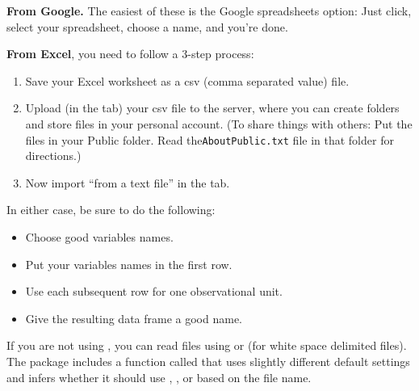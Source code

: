 
\textbf{From Google.}
The easiest of these is the Google spreadsheets option: Just click, select
your spreadsheet, choose a name, and you're done.

\textbf{From Excel},
you need to follow a 3-step process:
\begin{enumerate}
\item
Save your Excel worksheet as a csv (comma separated value) file.
\item
Upload (in the  tab) your csv file to the server, where you can create folders and store
files in your personal account.  
(To share things with others: Put the files in your Public folder.  
Read the\texttt{AboutPublic.txt} file in that folder for directions.)
\item
Now import ``from a text file'' in the  tab.
\end{enumerate}

In either case, be sure to do the following:
\begin{itemize}
\item Choose good variables names.
\item Put your variables names in the first row.
\item Use each subsequent row for one observational unit.
\item Give the resulting data frame a good name.
\end{itemize}
%

If you are not using \RStudio, you can read files using
 or  (for white space delimited files).
The  package includes a function called  that uses 
slightly different default settings and infers whether it should use ,
, or  based on the file name.  

